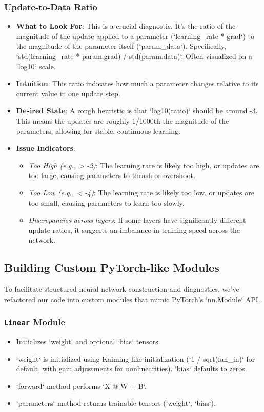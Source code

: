 \subsubsection{Update-to-Data Ratio}
\begin{itemize}
    \item \textbf{What to Look For}: This is a crucial diagnostic. It's the ratio of the magnitude of the update applied to a parameter (`learning_rate * grad`) to the magnitude of the parameter itself (`param_data`). Specifically, `std(learning_rate * param.grad) / std(param.data)`. Often visualized on a `log10` scale.
    \item \textbf{Intuition}: This ratio indicates how much a parameter changes relative to its current value in one update step.
    \item \textbf{Desired State}: A rough heuristic is that `log10(ratio)` should be around -3. This means the updates are roughly 1/1000th the magnitude of the parameters, allowing for stable, continuous learning.
    \item \textbf{Issue Indicators}:
        \begin{itemize}
            \item \textit{Too High (e.g., > -2)}: The learning rate is likely too high, or updates are too large, causing parameters to thrash or overshoot.
            \item \textit{Too Low (e.g., < -4)}: The learning rate is likely too low, or updates are too small, causing parameters to learn too slowly.
            \item \textit{Discrepancies across layers}: If some layers have significantly different update ratios, it suggests an imbalance in training speed across the network.
        \end{itemize}
\end{itemize}

\subsection{Building Custom PyTorch-like Modules}
To facilitate structured neural network construction and diagnostics, we've refactored our code into custom modules that mimic PyTorch's `nn.Module` API.

\subsubsection{\texttt{Linear} Module}
\begin{itemize}
    \item Initializes `weight` and optional `bias` tensors.
    \item `weight` is initialized using Kaiming-like initialization (`1 / sqrt(fan_in)` for default, with gain adjustments for nonlinearities). `bias` defaults to zeros.
    \item `forward` method performs `X @ W + B`.
    \item `parameters` method returns trainable tensors (`weight`, `bias`).
\end{itemize}

